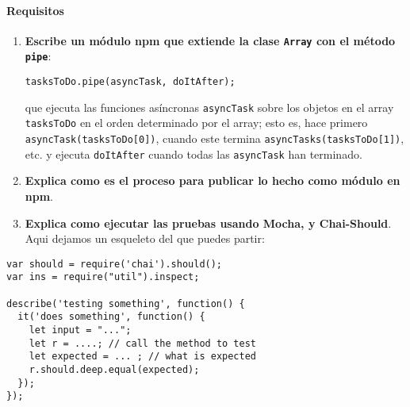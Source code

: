 \paragraph{Requisitos}\label{requisitos}

\begin{enumerate}
\def\labelenumi{\arabic{enumi}.}
\item
  \textbf{Escribe un módulo npm que extiende la clase \texttt{Array} con
  el método \texttt{pipe}}:

\begin{verbatim}
tasksToDo.pipe(asyncTask, doItAfter);
\end{verbatim}

que ejecuta las funciones asíncronas \texttt{asyncTask} sobre los
objetos en el array \texttt{tasksToDo} en el orden determinado por el 
array; esto es, hace primero \verb|asyncTask(tasksToDo[0])|, cuando este termina \verb|asyncTasks(tasksToDo[1])|, etc.
y ejecuta \texttt{doItAfter} cuando todas las \texttt{asyncTask} han terminado.
\item
  \textbf{Explica como es el proceso para publicar lo hecho como módulo
  en npm}.
\item
  \textbf{Explica como ejecutar las pruebas usando Mocha, y
  Chai-Should}. Aqui dejamos un esqueleto del que puedes partir:
\end{enumerate}

\begin{verbatim}
var should = require('chai').should();
var ins = require("util").inspect;

describe('testing something', function() {
  it('does something', function() {
    let input = "..."; 
    let r = ....; // call the method to test
    let expected = ... ; // what is expected
    r.should.deep.equal(expected);
  });
});
\end{verbatim}
